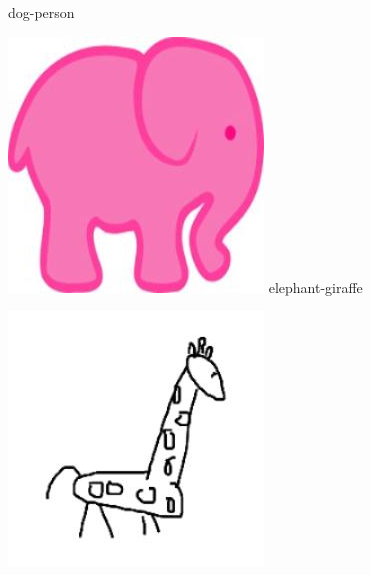 \documentclass{article}
\begin{document}
\begin{center}
\begin{minipage}{0.142\textwidth}
        dog-person
    \end{minipage}%
    \begin{minipage}{0.142\textwidth}
        \includegraphics[width=\linewidth]{./pic/misclassified_r1_p2_2723.jpg}
        elephant-giraffe
    \end{minipage}%
    \begin{minipage}{0.142\textwidth}
        \includegraphics[width=\linewidth]{./pic/misclassified_r2_p0_2723.jpg}

\end{minipage}
\end{center}
\end{document}
